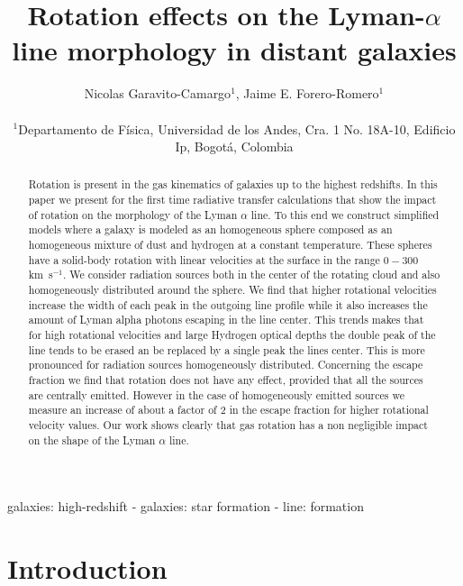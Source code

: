 \documentclass[usenatbib]{mn2e}
\newcommand{\kms}{\,km~s$^{-1}$}
\begin{document}
\title[Rotation in the Lyman-$\alpha$ line]{Rotation effects on the
  Lyman-$\alpha$ line morphology in distant galaxies}
\author[N. Garavito and J.E. Forero-Romero]{
\parbox[t]{\textwidth}{\raggedright 
  Nicolas Garavito-Camargo$^{1}$,
  Jaime E. Forero-Romero$^{1}$ 
}
\vspace*{6pt}\\
$^{1}$Departamento de F\'{i}sica, Universidad de los Andes, Cra. 1
No. 18A-10, Edificio Ip, Bogot\'a, Colombia 
}
\maketitle

\begin{abstract}
Rotation is present in the gas kinematics of galaxies up to the
highest redshifts. In this paper we present for the first time
radiative transfer calculations that show the impact of rotation on
the morphology of the Lyman $\alpha$ line. To this end we construct
simplified models where a galaxy is modeled as an homogeneous sphere
composed as an homogeneous mixture of dust and hydrogen at a constant
temperature. These spheres have a solid-body rotation with linear
velocities at the surface in the range $0-300$ \kms. We consider
radiation sources both in the center of the rotating cloud and also
homogeneously distributed around the sphere. We find that higher
rotational velocities increase the width of each peak in the outgoing
line profile while it also increases the amount of Lyman alpha photons
escaping in the line center. This trends makes that for high
rotational velocities and large Hydrogen optical depths the double
peak of the line tends to be erased an be replaced by a single peak the
lines center. This is more pronounced for radiation sources
homogeneously distributed. Concerning the escape fraction we find that
rotation does not have any effect, provided that all the sources are
centrally emitted. However in the case of homogeneously emitted
sources we measure an increase of about a factor of $2$ in the escape
fraction for higher rotational velocity values. 
Our work shows clearly that gas rotation has a non
negligible impact on the shape of the Lyman $\alpha$ line.

\end{abstract}
\begin{keywords}
galaxies: high-redshift - galaxies: star formation - line: formation
\end{keywords}


\section{Introduction}
\label{sec:intro}
\end{document}
